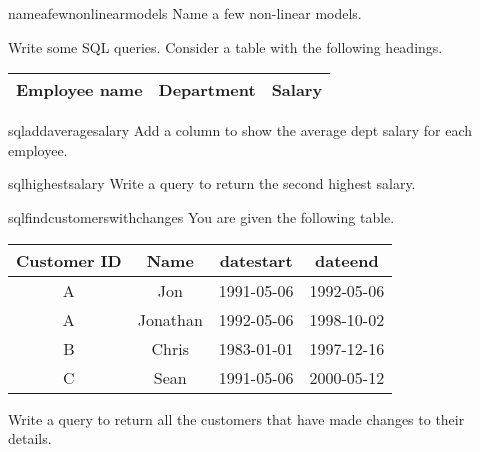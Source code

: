 \documentclass[a4paper]{article}
\begin{document}
\begin{question}{nameafewnonlinearmodels}
Name a few non-linear models.
\end{question}



\begin{questionwithnoanswer}
Write some SQL queries.
Consider a table with the following headings.
\begin{center}
\begin{tabular}{|c|c|c|}
\hline
   Employee name & Department & Salary \\
\hline
\end{tabular}
\end{center}
\end{questionwithnoanswer}

\begin{subquestion}{sqladdaveragesalary}
Add a column to show the average dept salary for each employee.
\end{subquestion}


\begin{subquestion}{sqlhighestsalary}
Write a query to return the second highest salary.
\end{subquestion}



\begin{question}{sqlfindcustomerswithchanges}
You are given the following table.
\begin{center}
\begin{tabular}{|c|c|c|c|}
\hline
     Customer ID    &   Name     &  datestart     & dateend     \\
\hline
     A              &   Jon      &  1991-05-06    & 1992-05-06  \\
     A              &   Jonathan &  1992-05-06    & 1998-10-02  \\
     B              &   Chris    &  1983-01-01    & 1997-12-16  \\
     C              &   Sean     &  1991-05-06    & 2000-05-12  \\
\hline
\end{tabular}
\end{center}
Write a query to return all the customers that have made changes to their details.
\end{question}

\clearpage





\end{document}
